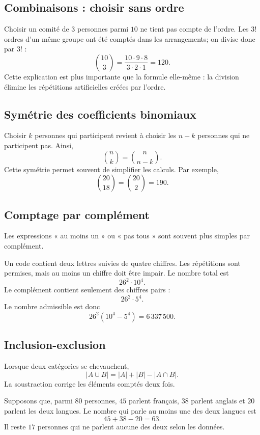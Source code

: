 \documentclass[12pt,a4paper,openany]{book}
\newcommand{\abs}[1]{\left\lvert #1\right\rvert}
\begin{document}
\subsection{Combinaisons : choisir sans ordre}

Choisir un comité de $3$ personnes parmi $10$ ne tient pas compte de l'ordre. Les $3!$ ordres d'un même groupe ont été comptés dans les arrangements; on divise donc par $3!$ :
\[
\binom{10}{3}=\frac{10\cdot9\cdot8}{3\cdot2\cdot1}=120.
\]
Cette explication est plus importante que la formule elle-même : la division élimine les répétitions artificielles créées par l'ordre.

\subsection{Symétrie des coefficients binomiaux}

Choisir $k$ personnes qui participent revient à choisir les $n-k$ personnes qui ne participent pas. Ainsi,
\[
\binom nk=\binom n{n-k}.
\]
Cette symétrie permet souvent de simplifier les calculs. Par exemple,
\[
\binom{20}{18}=\binom{20}{2}=190.
\]

\subsection{Comptage par complément}

Les expressions « au moins un » ou « pas tous » sont souvent plus simples par complément.

\begin{examplebox}
Un code contient deux lettres suivies de quatre chiffres. Les répétitions sont permises, mais au moins un chiffre doit être impair. Le nombre total est
\[
26^2\cdot10^4.
\]
Le complément contient seulement des chiffres pairs :
\[
26^2\cdot5^4.
\]
Le nombre admissible est donc
\[
26^2(10^4-5^4)=6\,337\,500.
\]
\end{examplebox}

\subsection{Inclusion-exclusion}

Lorsque deux catégories se chevauchent,
\[
\abs{A\cup B}=\abs A+\abs B-\abs{A\cap B}.
\]
La soustraction corrige les éléments comptés deux fois.

Supposons que, parmi $80$ personnes, $45$ parlent français, $38$ parlent anglais et $20$ parlent les deux langues. Le nombre qui parle au moins une des deux langues est
\[
45+38-20=63.
\]
Il reste $17$ personnes qui ne parlent aucune des deux selon les données.
\end{document}
